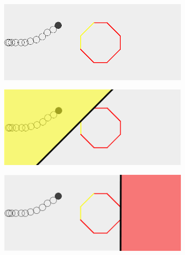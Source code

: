 \begin{figure}[!t]
    \centering
    
    \begin{subfigure}[t]{0.47\textwidth}
        \includegraphics[width=\textwidth]{img/obs1}
        \caption{}
    \end{subfigure}
    \hfil
    \begin{subfigure}[t]{0.47\textwidth}
        \includegraphics[width=\textwidth]{img/obs2}
        \caption{}
    \end{subfigure}
    \par\bigskip
    \begin{subfigure}[t]{0.47\textwidth}
        \includegraphics[width=\textwidth]{img/obs3}
        \caption{}
    \end{subfigure}

\end{figure}
